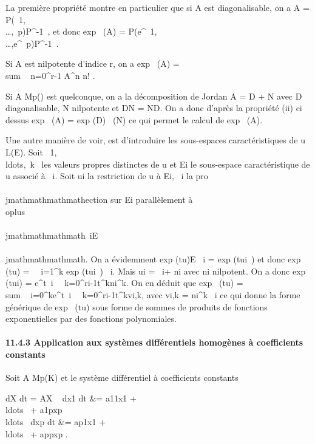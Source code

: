 La première propriété montre en particulier que si A est diagonalisable,
on a A =
P\mathrmdiag(\lambda~1,\\\ldots,\lambda~p)P^-1~,
et donc exp~ (A) =
P\mathrmdiag(e^\lambda~1,\\\ldots,e^\lambda~p)P^-1~.

Si A est nilpotente d'indice r, on a exp~ (A)
= \\sum ~
n=0^r-1 A^n \over n! .

Si A \in Mp() est quelconque, on a la décomposition de Jordan A
= D + N avec D diagonalisable, N nilpotente et DN = ND. On a donc
d'après la propriété (ii) ci dessus exp~ (A)
= exp (D)\exp~ (N) ce
qui permet le calcul de exp~ (A).

Une autre manière de voir, est d'introduire les sous-espaces
caractéristiques de u \in L(E). Soit
\lambda~1,\\ldots,\lambda~k~
les valeurs propres distinctes de u et Ei le sous-espace
caractéristique de u associé à \lambda~i. Soit ui la
restriction de u à Ei, \pi~i la pro\\\\jmathmathmathmathection sur
Ei parallèlement à
\\oplus~ ~
\\\\jmathmathmathmath\neq~iE\\\\jmathmathmathmath. On a évidemment
exp (tu)\textbar{}E~
i = exp (tui~) et donc
exp~ (tu) =\
\sum ~
i=1^k exp (tui~) \cdot
\pi~i. Mais ui =
\lambda~i\mathrmId + ni avec
ni nilpotent. On a donc exp~
(tui) = e^t\lambda~i\
\sum~
k=0^ri-1t^kni^k. On
en déduit que exp~ (tu)
= \\sum ~
i=0^ke^t\lambda~i\
\sum~
k=0^ri-1t^kvi,k, avec
vi,k = ni^k \cdot \pi~i ce qui donne la
forme générique de exp~ (tu) sous forme de
sommes de produits de fonctions exponentielles par des fonctions
polynomiales.

\paragraph{11.4.3 Application aux systèmes différentiels homogènes à
coefficients constants}

Soit A \in Mp(K) et le système différentiel à coefficients
constants

 dX \over dt = AX \Leftrightarrow
\left \ \cases 
dx1 \over dt &= a11x1 +
\\ldots~ +
a1pxp \cr
\\ldots~
\cr  dxp \over dt &=
ap1x1 +
\\ldots~ +
appxp  \right .

